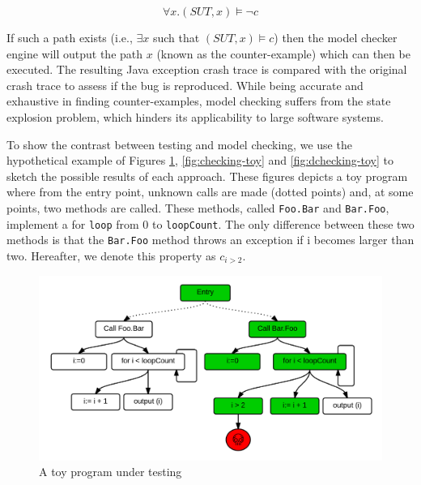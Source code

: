 \documentclass[times]{smrauth}
\begin{document}
\begin{equation}
\forall x.(SUT, x) \models \neg c
\end{equation}

If such a path exists (i.e., $\exists x$  such that $(SUT, x)  \models c$) then the model checker engine will output the path $x$ (known as the counter-example) which can then be executed. The resulting Java exception crash trace is compared with the original crash trace to assess if the bug is reproduced. While  being  accurate and exhaustive in finding counter-examples, model checking suffers from the state explosion problem, which hinders its applicability to large software systems.


To show the contrast between testing and model checking, we use the hypothetical example of Figures \ref{fig:testing-toy}, \ref{fig:checking-toy} and \ref{fig:dchecking-toy} to sketch the possible results of each approach. These figures depicts a toy program where from the entry point, unknown calls are made (dotted points) and, at some points, two methods are called. These methods, called \texttt{Foo.Bar} and \texttt{Bar.Foo}, implement a for \texttt{loop} from 0 to \texttt{loopCount}. The only difference between these two methods is that the \texttt{Bar.Foo} method throws an exception if i becomes larger than two. Hereafter, we denote this property as $c_{i > 2}$.  


\begin{figure}[h!]
  \centering
    \includegraphics[scale=0.7]{media/dmc.png}
    \caption{A toy program under testing
    \label{fig:testing-toy}}
\end{figure}
\end{document}

